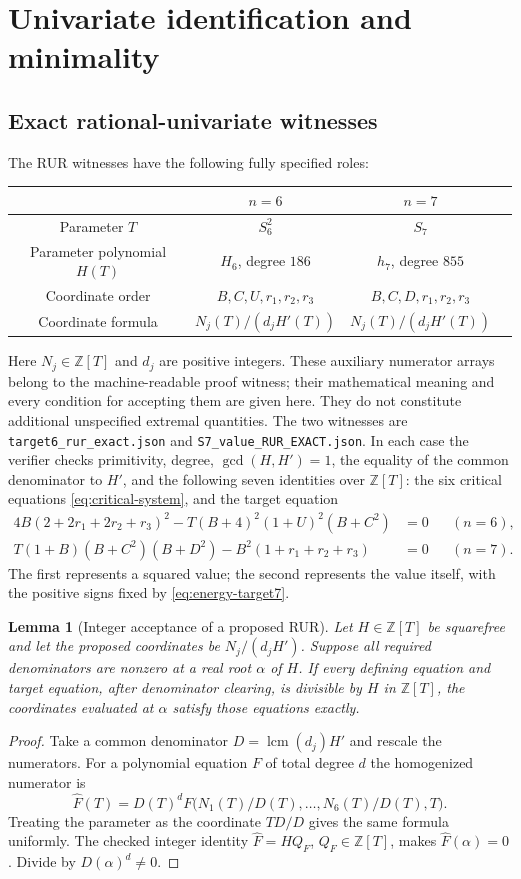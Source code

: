 \documentclass[11pt]{article}
\newtheorem{lemma}[theorem]{Lemma}
\newcommand{\Z}{\mathbb Z}
\begin{document}
\section{Univariate identification and minimality}\label{sec:minimal}
\subsection{Exact rational-univariate witnesses}
The RUR witnesses have the following fully specified roles:
\begin{center}\small
\begin{tabular}{c|ccc}
\toprule &$n=6$&$n=7$\\\midrule
Parameter $T$&$S_6^2$&$S_7$\\
Parameter polynomial $H(T)$&$H_6$, degree $186$&$h_7$, degree $855$\\
Coordinate order&$B,C,U,r_1,r_2,r_3$&$B,C,D,r_1,r_2,r_3$\\
Coordinate formula&$N_j(T)/(d_jH'(T))$&$N_j(T)/(d_jH'(T))$\\\bottomrule
\end{tabular}
\end{center}
Here $N_j\in\Z[T]$ and $d_j$ are positive integers. These auxiliary
numerator arrays belong to the machine-readable proof witness; their
mathematical meaning and every condition for accepting them are given
here. They do not constitute additional unspecified extremal quantities.
The two witnesses are \texttt{target6\_rur\_exact.json} and
\texttt{S7\_value\_RUR\_EXACT.json}.
In each case the verifier checks primitivity, degree, $\gcd(H,H')=1$,
the equality of the common denominator to $H'$, and the following seven
identities over $\Z[T]$: the six critical equations
\eqref{eq:critical-system}, and the target equation
\begin{align}\label{eq:target-equations}
 4B(2+2r_1+2r_2+r_3)^2
       -T(B+4)^2(1+U)^2(B+C^2)&=0&& (n=6),\nonumber\\
 T(1+B)(B+C^2)(B+D^2)-B^2(1+r_1+r_2+r_3)&=0&& (n=7).
\end{align}
The first represents a squared value; the second represents the value
itself, with the positive signs fixed by \eqref{eq:energy-target7}.

\begin{lemma}[Integer acceptance of a proposed RUR]\label{lem:RUR}
Let $H\in\Z[T]$ be squarefree and let the proposed coordinates be
$N_j/(d_jH')$. Suppose all required denominators are nonzero at a real
root $\alpha$ of $H$. If every defining equation and target equation,
after denominator clearing, is divisible by $H$ in $\Z[T]$, the
coordinates evaluated at $\alpha$ satisfy those equations exactly.
\end{lemma}
\begin{proof}
Take a common denominator $D=\operatorname{lcm}(d_j)H'$ and rescale the
numerators. For a polynomial equation $F$ of total degree $d$ the
homogenized numerator is
\[
 \widehat F(T)=D(T)^dF\bigl(N_1(T)/D(T),\ldots,N_6(T)/D(T),T\bigr).
\]
Treating the parameter as the coordinate $TD/D$ gives the same formula
uniformly. The checked integer identity
$\widehat F=H Q_F$, $Q_F\in\Z[T]$, makes $\widehat F(\alpha)=0$.
Divide by $D(\alpha)^d\ne0$.
\end{proof}
\end{document}
